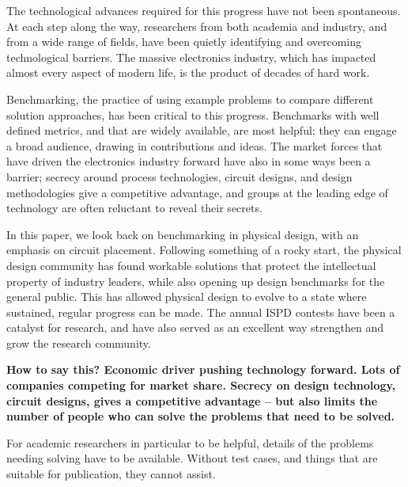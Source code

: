 \documentclass[sigconf]{acmart}
\begin{document}
The technological advances required for this progress
have not been spontaneous.  At each
step along the way, researchers from both academia and
industry, and from a wide range of fields,
have been quietly identifying and overcoming
technological barriers.  The massive electronics industry,
which has impacted almost every aspect of modern life,
is the product of decades of hard work.

\iffalse
VLSI physical design focuses on translating the logical function
of a system into an equivalent physical representation.  
Logic synthesis involves translation of higher level system
specifications into simple logic elements.  This is followed by
placement, the location of logic elements onto a two-dimensional
plane, and then routing, which connects logic elements together
with wiring.  This portion of the circuit design process is
normally referred to as ``physical design.''
\fi

Benchmarking, the practice of using example problems to compare
different solution approaches, has been critical to this progress.
Benchmarks with well defined metrics, and that are widely
available, are most helpful; they can engage a broad audience, drawing
in contributions and ideas.  The market forces that have driven the
electronics industry forward have also in some ways been a barrier;
secrecy
around process technologies, circuit designs, and design methodologies
give a competitive advantage, and groups at the leading edge of
technology are often reluctant to reveal their secrets.

In this paper, we look back on benchmarking in physical design, with
an emphasis on circuit placement.  Following something of a rocky
start, the physical design community has found workable solutions that
protect the intellectual property of industry leaders, while also
opening up design benchmarks for the general public.  This has allowed
physical design to evolve to a state where sustained, regular progress
can be made.  The annual ISPD contests have been a catalyst for
research, and have also served as an excellent way strengthen and grow
the research community.

\iffalse
{\bf How to say this?
  Economic driver pushing technology forward.  Lots of
  companies competing for market share.  Secrecy on
  design technology, circuit designs, gives a competitive
  advantage -- but also limits the number of people who
  can solve the problems that need to be solved.

  For academic researchers in particular to be helpful,
  details of the problems needing solving have to be
  available.  Without test cases, and things that are
  suitable for publication, they cannot assist.
}
\end{document}
